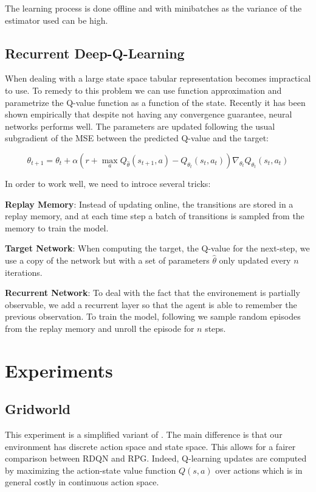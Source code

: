 \documentclass{article} %
\begin{document}
The learning process is done offline and with minibatches as the variance of the estimator used can be high.

\subsection{Recurrent Deep-Q-Learning}
When dealing with a large state space tabular representation becomes impractical to use. To remedy to this problem we can use function approximation and parametrize the Q-value function as a function of the state. Recently it has been shown \cite{mnih2015human} empirically that despite not having any convergence guarantee, neural networks performs well.
The parameters are updated following the usual subgradient of the MSE between the predicted Q-value and the target:

$$\theta_{t+1} = \theta_t + \alpha(r+\max_a Q_{\hat{\theta}}(s_{t+1}, a) - Q_{\theta_t}(s_t, a_t))\nabla_{\theta_t}Q_{\theta_t}(s_t, a_t)$$

In order to work well, we need to introce several tricks:

\textbf{Replay Memory}: Instead of updating online, the transitions are stored in a replay memory, and at each time step a batch of transitions is sampled from the memory to train the model.

\textbf{Target Network}: When computing the target, the Q-value for the next-step, we use a copy of the network but with a set of parameters $\hat{\theta}$ only updated every $n$ iterations.


\textbf{Recurrent Network}: To deal with the fact that the environement is partially observable, we add a recurrent layer so that the agent is able to remember the previous observation. To train the model, following \cite{hausknecht2015deep} we sample random episodes from the replay memory and unroll the episode for $n$ steps.

\section{Experiments}
\subsection{Gridworld}
This experiment is a simplified variant of \cite{mordatch2017emergence}. The main difference is that our environment has discrete action space and state space. This allows for a fairer comparison between RDQN and RPG. Indeed, Q-learning updates are computed by maximizing the action-state value function $Q(s,a)$ over actions which is in general costly in continuous action space. 
\end{document}
